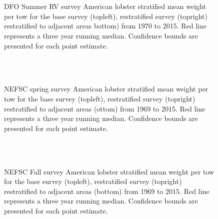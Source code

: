 \documentclass[11pt]{article}
\newcommand{\e}{/backup/bio_data/bio.lobster/figures/} %
\begin{document}
\begin{figure}
\centering
{}
\\
\\

\caption{DFO Summer RV survey American lobster stratified mean weight per tow for the base survey (topleft), restratified survey (topright) restratified to adjacent areas bottom) from 1970 to 2015. Red line represents a three year running median. Confidence bounds are presented for each point estimate.}
\end{figure}
\clearpage



\begin{figure}
\centering
{}
\\
\\

\caption{NEFSC spring survey American lobster stratified mean weight per tow for the base survey (topleft), restratified survey (topright) restratified to adjacent areas (ottom) from 1969 to 2015. Red line represents a three year running median. Confidence bounds are presented for each point estimate. }
\end{figure}
\clearpage



\begin{figure}
\centering
{}
\\
\\

\caption{NEFSC Fall survey American lobster stratified mean weight per tow for the base survey (topleft), restratified survey (topright) restratified to adjacent areas (bottom) from 1969 to 2015. Red line represents a three year running median. Confidence bounds are presented for each point estimate. }
\end{figure}
\clearpage
\end{document}
